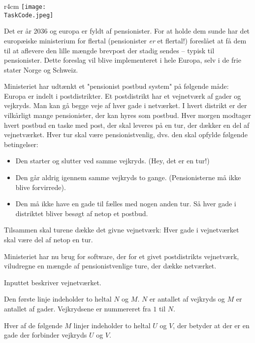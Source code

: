 \documentclass{boi2014-dk}
\renewcommand{\TaskCode}{postmen}
\begin{document}
    \begin{wrapfigure}[8]{r}{4cm}
        \vspace{-18pt}
		\texttt{[image: \\TaskCode.jpeg]}
	\end{wrapfigure}

    Det er år 2036 og europa er fyldt af pensionister. For at holde dem sunde
    har det europæiske ministerium for flertal (pensionister \emph{er} et
    flertal!) foreslået at få dem til at aflevere den lille mængde brevpost
    der stadig sendes -- typisk til pensionister. Dette foreslag vil blive
    implementeret i hele Europa, selv i de frie stater Norge og Schweiz.

    Ministeriet har udtænkt et "pensionist postbud system" på følgende måde:
    Europa er indelt i postdistrikter. Et postdistrikt har et vejnetværk af
    gader og vejkryds. Man kan gå begge veje af hver gade i netværket. I hvert
    distrikt er der vilkårligt mange pensionister, der kan hyres som postbud.
    Hver morgen modtager hvert postbud en taske med post, der skal leveres på
    en tur, der dækker en del af vejnetværket. Hver tur skal være
    pensionistvenlig, dvs. den skal opfylde følgende betingelser:

    \begin{itemize}
        \item Den starter og slutter ved samme vejkryds. (Hey, det er en
            tur!)
        \item Den går aldrig igennem samme vejkryds to gange. (Pensionisterne
            må ikke blive forvirrede).
        \item Den må ikke have en gade til fælles med nogen anden tur. Så hver
            gade i distriktet bliver besøgt af netop et postbud.
    \end{itemize}

    Tilsammen skal turene dække det givne vejnetværk: Hver gade i
    vejnetværket skal være del af netop en tur.

    \Task
    Ministeriet har nu brug for software, der for et givet postdistrikts
    vejnetværk, viludregne en mængde af pensionistvenlige ture, der
    dække netværket.

    \Input
    Inputtet beskriver vejnetværket.

    Den første linje indeholder to heltal $N$ og $M$. $N$ er antallet af
    vejkryds og $M$ er antallet af gader. Vejkrydsene er nummereret fra
    $1$ til $N$.

    Hver af de følgende $M$ linjer indeholder to heltal $U$ og $V$, der
    betyder at der er en gade der forbinder vejkryds $U$ og $V$.
\end{document}
